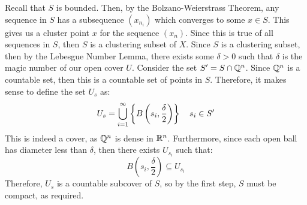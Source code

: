 \documentclass{article}
\begin{document}
\begin{pf}
    Recall that $ S $ is bounded. Then, by the Bolzano-Weierstrass Theorem,
    any sequence in $ S $ has a subsequence $ (x_{n_{i}}) $ which
    converges to some $ x \in S $. This gives us a cluster point $ x $ for the sequence $ (x_{n}) $.
    Since this is true of all sequences in $ S $, then $ S $ is a clustering subset of $ X $. \vsp
    Since $ S $ is a clustering subset, then by the Lebesgue Number Lemma, there exists some
    $ \delta > 0 $ such that $ \delta $ is the magic number of our open cover $ U $. \vsp
    Consider the set $ S' = S \cap \mathbb{Q}^{n} $. Since $ \mathbb{Q}^{n} $ is a countable set,
    then this is a countable set of points in $ S $.
    Therefore, it makes sense to define the set $ U_{s} $ as:
    \begin{equation*}
        U_{s} = \bigcup_{i=1}^{\infty} \left\{{B \left( s_{i}, \frac{\delta}{2} \right) }\right\} \quad
        s_{i} \in S'
    \end{equation*}
    This is indeed a cover, as $ \mathbb{Q}^{n} $ is dense in $ \mathbb{R}^{n} $.
    Furthermore, since each open ball has diameter less than $ \delta $,
    then there exists $ U_{s_{i}} $ such that:
    \begin{equation*}
        B \left( s_{i}, \frac{\delta}{2} \right) \subseteq U_{s_{i}}
    \end{equation*}
    Therefore, $ U_{s} $ is a countable subcover of $ S $, so by the first step,
    $ S $ must be compact, as required.
\end{pf}
\end{document}
